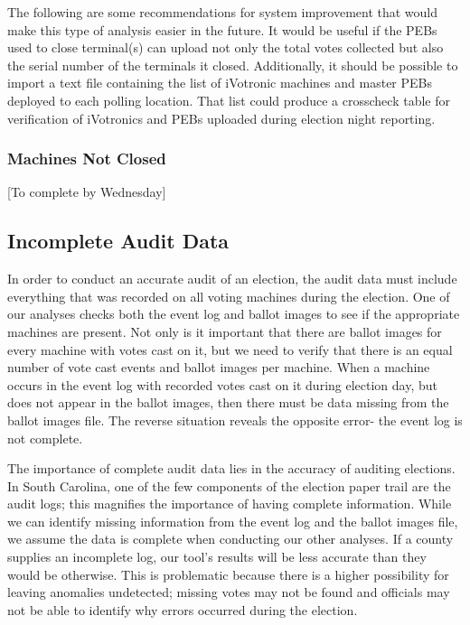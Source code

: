 The following are some recommendations for system improvement that would make this type of analysis easier in the future.  It would be useful if the PEBs used to close terminal(s) can upload not only the total votes collected but also the serial number of the terminals it closed. Additionally, it should be possible to import a text file containing the list of iVotronic machines and master PEBs deployed to each polling location.  That list could produce a crosscheck table for verification of iVotronics and PEBs uploaded during election night reporting.

\subsubsection{Machines Not Closed}
[To complete by Wednesday]

\subsection{Incomplete Audit Data}
In order to conduct an accurate audit of an election, the audit data must include everything that was recorded on all voting machines during the election.  One of our analyses checks both the event log and ballot images to see if the appropriate machines are present.  Not only is it important that there are ballot images for every machine with votes cast on it, but we need to verify that there is an equal number of vote cast events and ballot images per machine.  When a machine occurs in the event log with recorded votes cast on it during election day, but does not appear in the ballot images, then there must be data missing from the ballot images file.  The reverse situation reveals the opposite error- the event log is not complete.  

The importance of complete audit data lies in the accuracy of auditing elections.  In South Carolina, one of the few components of the election paper trail are the audit logs; this magnifies the importance of having complete information.  While we can identify missing information from the event log and the ballot images file, we assume the data is complete when conducting our other analyses.  If a county supplies an incomplete log, our tool's results will be less accurate than they would be otherwise.  This is problematic because there is a higher possibility for leaving anomalies undetected; missing votes may not be found and officials may not be able to identify why errors occurred during the election.  

